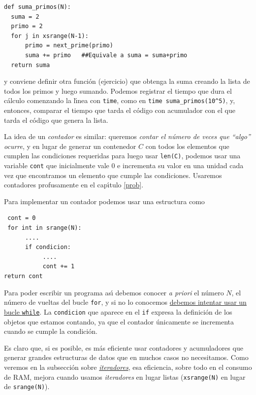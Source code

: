 \begin{lstlisting}
def suma_primos(N):
  suma = 2
  primo = 2
  for j in xsrange(N-1):
      primo = next_prime(primo)
      suma += primo   ##Equivale a suma = suma+primo
  return suma
\end{lstlisting}

\noindent y conviene definir otra funci\'on ({\sc ejercicio}) que obtenga la
suma creando la lista de todos los primos y luego sumando. Podemos registrar el
tiempo que dura el c\'alculo comenzando la l\'{\i}nea con \lstinline|time|, 
como 
en \lstinline|time suma_primos(10^5)|, y, entonces, comparar el tiempo que tarda
el c\'odigo con acumulador con el que tarda el c\'odigo que genera la lista. 


La idea de un {\itshape contador} es similar: queremos {\itshape contar el
n\'umero de veces que ``algo'' ocurre}, y en lugar de generar un contenedor $C$
con todos los elementos que cumplen las condiciones requeridas para luego usar
\lstinline|len(C)|, podemos usar una variable {\tt cont}  que inicialmente
vale $0$ e incrementa su valor en una unidad cada vez que encontramos un
elemento que cumple las condiciones. Usaremos contadores profusamente en el
cap\'{\i}tulo \ref{prob}.

Para implementar un contador podemos usar una  estructura como 
\begin{lstlisting}
 cont = 0
 for int in srange(N):
      ....
      if condicion:
           ....
           cont += 1
return cont
\end{lstlisting}

Para poder escribir un programa as\'{\i} debemos conocer {\itshape a priori} el
n\'umero $N$, el n\'umero de vueltas del bucle \lstinline|for|, y si no lo
conocemos \hyperref[cont-w]{debemos intentar usar un bucle \lstinline|while|}.
La {\tt condicion} que aparece en el \lstinline|if| expresa la
definici\'on de los objetos que estamos contando, ya que el contador
\'unicamente se incrementa cuando se cumple la condici\'on. 







Es claro que, si es posible, es m\'as eficiente usar contadores y acumuladores
que generar grandes estructuras de datos que en muchos casos no necesitamos.
Como veremos en la subsecci\'on sobre \hyperref[iter]{\itshape{iteradores}},
esa eficiencia, sobre todo en el
consumo de RAM,  mejora cuando usamos
{\itshape iteradores} en lugar listas (\lstinline|xsrange(N)| en lugar de
\lstinline|srange(N)|).



